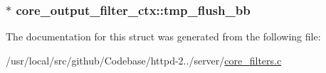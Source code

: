 \subsubsection[{\texorpdfstring{tmp\+\_\+flush\+\_\+bb}{tmp_flush_bb}}]{$\ast$ core\+\_\+output\+\_\+filter\+\_\+ctx\+::tmp\+\_\+flush\+\_\+bb}\hypertarget{structcore__output__filter__ctx_a4ace06e703ead7dd323d06811b1b5dc9}{}\label{structcore__output__filter__ctx_a4ace06e703ead7dd323d06811b1b5dc9}


The documentation for this struct was generated from the following file\+:\begin{DoxyCompactItemize}
\item 
/usr/local/src/github/\+Codebase/httpd-\/2../server/\hyperlink{core__filters_8c}{core\+\_\+filters.\+c}\end{DoxyCompactItemize}
